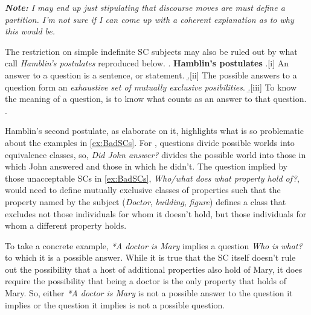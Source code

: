 \documentclass[GPFinal]{subfiles}
\begin{document}
\singlespacing \textit{\textbf{Note:} I may end up just stipulating that discourse moves are must define a partition. I'm not sure if I can come up with a coherent explanation as to why this would be.}
\doublespacing

The restriction on simple indefinite SC subjects may also be ruled out by what \textcite{groenendijkstokhof1996questions} call \textit{Hamblin's postulates} reproduced below.
\ex. \textbf{Hamblin's postulates} \parencite[][emphasis mine]{groenendijkstokhof1996questions}
\a.[i] An answer to a question is a sentence, or statement.
\b.[ii] The possible answers to a question form an \textit{exhaustive set of mutually exclusive posibilities}.
\b.[iii] To know the meaning of a question, is to know what counts as an answer to that question.
\z.

Hamblin's second postulate, as \textcite{groenendijkstokhof1996questions} elaborate on it, highlights what is so problematic about the examples in \ref{ex:BadSCs}.
For \citeauthor{groenendijkstokhof1996questions}, questions divide possible worlds into equivalence classes, so, \textit{Did John answer?} divides the possible world into those in which John answered and those in which he didn't.
The question implied by those unacceptable SCs in \ref{ex:BadSCs}, \textit{Who/what does what property hold of?}, would need to define mutually exclusive classes of properties such that the property named by the subject (\textit{Doctor}, \textit{building}, \textit{figure}) defines a class that excludes not those individuals for whom it doesn't hold, but those individuals for whom a different property holds.

To take a concrete example, \textit{*A doctor is Mary} implies a question \textit{Who is what?} to which it is a possible answer.
While it is true that the SC itself doesn't rule out the possibility that a host of additional properties also hold of Mary, it does require the possibility that being a doctor is the only property that holds of Mary.
So, either \textit{*A doctor is Mary} is not a possible answer to the question it implies or the question it implies is not a possible question.

%
\end{document}
